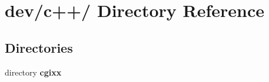 \section{dev/c++/ Directory Reference}
\label{dir_a381a3d4d7b5849d8a061ce9e6ddf747}
\subsection*{Directories}
\begin{CompactItemize}
\item 
directory {\bf cgixx}
\end{CompactItemize}
